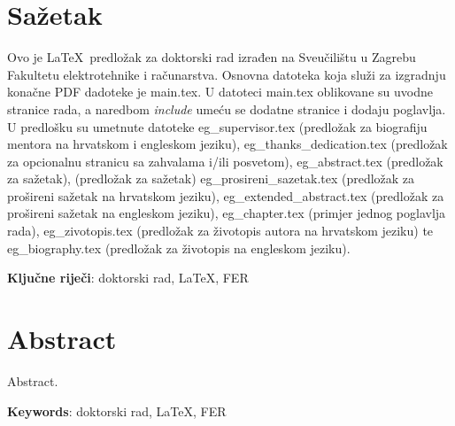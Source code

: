 \thispagestyle{empty}


\section*{Sažetak}

Ovo je \LaTeX\ predložak za doktorski rad izrađen na Sveučilištu u Zagrebu
Fakultetu elektrotehnike i računarstva. Osnovna datoteka  koja služi za
izgradnju konačne PDF dadoteke je main.tex. U datoteci main.tex oblikovane su
uvodne stranice rada, a naredbom \textit{include} umeću se dodatne stranice i
dodaju poglavlja. U predlošku su umetnute datoteke eg\_supervisor.tex
(predložak za biografiju mentora na hrvatskom i engleskom jeziku),
eg\_thanks\_dedication.tex (predložak za opcionalnu stranicu sa zahvalama i/ili
posvetom), eg\_abstract.tex (predložak za sažetak), (predložak za sažetak)
eg\_prosireni\_sazetak.tex (predložak za prošireni sažetak na hrvatskom
jeziku), eg\_extended\_abstract.tex (predložak za prošireni sažetak na
engleskom jeziku), eg\_chapter.tex (primjer jednog poglavlja rada),
eg\_zivotopis.tex (predložak za životopis autora na hrvatskom jeziku) te
eg\_biography.tex (predložak za životopis na engleskom jeziku).

\vspace{1cm}
\textbf{Ključne riječi}:  doktorski rad, \LaTeX, FER


\section*{Abstract}


Abstract.

\vspace{1cm}
\textbf{Keywords}:  doktorski rad, \LaTeX, FER
